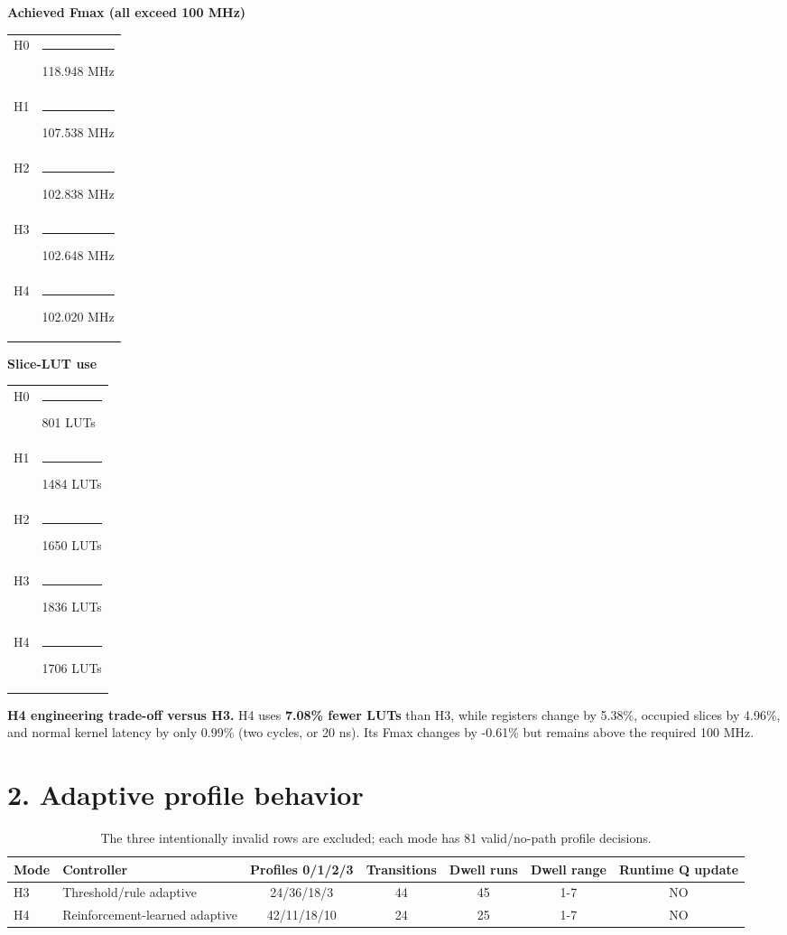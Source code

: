 \documentclass[10pt,a4paper]{article}
\newcommand{\resultbox}[2]{
  \noindent\colorbox{#1}{\parbox{0.965\linewidth}{#2}}
}
\begin{document}
\begin{minipage}[t]{0.49\textwidth}
\textbf{Achieved Fmax (all exceed 100 MHz)}\\[-2pt]
\begin{tabular}{ll}
H0 & \rule{5.055cm}{1.25ex} 118.948 MHz \\
H1 & \rule{4.570cm}{1.25ex} 107.538 MHz \\
H2 & \rule{4.371cm}{1.25ex} 102.838 MHz \\
H3 & \rule{4.363cm}{1.25ex} 102.648 MHz \\
H4 & \rule{4.336cm}{1.25ex} 102.020 MHz \\
\end{tabular}
\end{minipage}
\hfill
\begin{minipage}[t]{0.49\textwidth}
\textbf{Slice-LUT use}\\[-2pt]
\begin{tabular}{ll}
H0 & \rule{2.225cm}{1.25ex} 801 LUTs \\
H1 & \rule{4.122cm}{1.25ex} 1484 LUTs \\
H2 & \rule{4.583cm}{1.25ex} 1650 LUTs \\
H3 & \rule{5.100cm}{1.25ex} 1836 LUTs \\
H4 & \rule{4.739cm}{1.25ex} 1706 LUTs \\
\end{tabular}
\end{minipage}

\vspace{6pt}
\resultbox{PaleBlue}{
\textbf{H4 engineering trade-off versus H3.}
H4 uses \textbf{7.08\% fewer LUTs} than H3,
while registers change by 5.38\%, occupied
slices by 4.96\%, and normal kernel latency by
only 0.99\% (two cycles, or 20 ns).
Its Fmax changes by -0.61\% but remains above the
required 100 MHz.
}

\section*{2. Adaptive profile behavior}

\begin{table}[H]
\centering
\small
\begin{tabular}{llccccc}
\toprule
Mode & Controller & Profiles 0/1/2/3 & Transitions & Dwell runs &
Dwell range & Runtime Q update \\
\midrule
H3 & Threshold/rule adaptive & 24/36/18/3 & 44 & 45 & 1-7 & NO \\
H4 & Reinforcement-learned adaptive & 42/11/18/10 & 24 & 25 & 1-7 & NO \\
\bottomrule
\end{tabular}
\caption{The three intentionally invalid rows are excluded; each mode has
81 valid/no-path profile decisions.}
\end{table}
\end{document}
